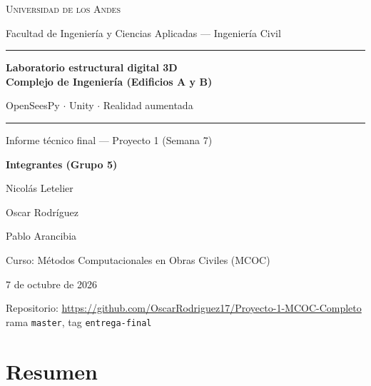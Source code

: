 \documentclass[11pt,a4paper]{article}
\newcommand{\fecha}{7 de octubre de 2026}
\begin{document}
\begin{titlepage}
\centering
\vspace*{1.2cm}
{\large\scshape Universidad de los Andes\par}
\vspace{0.2cm}
{\normalsize Facultad de Ingeniería y Ciencias Aplicadas --- Ingeniería Civil\par}
\vspace{2.2cm}
\rule{\textwidth}{1.2pt}\par\vspace{0.4cm}
{\LARGE\bfseries Laboratorio estructural digital 3D\\[0.2cm]
Complejo de Ingeniería (Edificios A y B)\par}
\vspace{0.4cm}
{\large OpenSeesPy $\cdot$ Unity $\cdot$ Realidad aumentada\par}
\vspace{0.3cm}\rule{\textwidth}{1.2pt}\par
\vspace{1.4cm}
{\Large Informe técnico final --- Proyecto 1 (Semana 7)\par}
\vspace{2.4cm}
{\large\bfseries Integrantes (Grupo 5)\par}
\vspace{0.3cm}
{\large Nicolás Letelier\par Oscar Rodríguez\par Pablo Arancibia\par}
\vspace{2.0cm}
{\large Curso: Métodos Computacionales en Obras Civiles (MCOC)\par}
\vspace{0.3cm}
{\large \fecha\par}
\vfill
{\small Repositorio: \url{https://github.com/OscarRodriguez17/Proyecto-1-MCOC-Completo}\\
rama \texttt{master}, tag \texttt{entrega-final}\par}
\end{titlepage}

\tableofcontents
\newpage

\section{Resumen}
\end{document}
